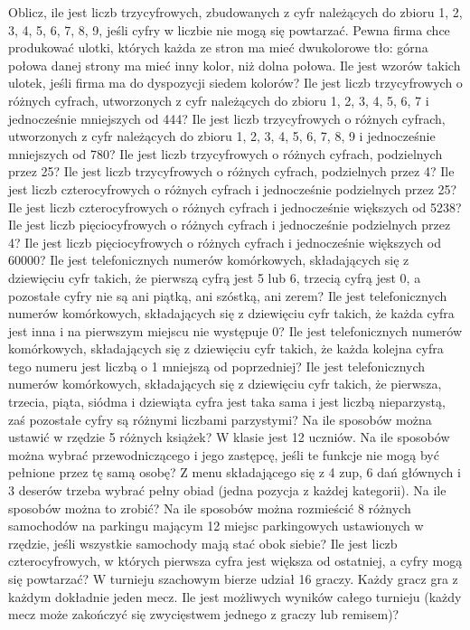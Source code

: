 Oblicz, ile jest liczb trzycyfrowych, zbudowanych z cyfr należących do zbioru {1, 2, 3, 4, 5, 6, 7, 8, 9}, jeśli cyfry w liczbie nie mogą się powtarzać.
Pewna firma chce produkować ulotki, których każda ze stron ma mieć dwukolorowe tło: górna połowa danej strony ma mieć inny kolor, niż dolna połowa. Ile jest wzorów takich ulotek, jeśli firma ma do dyspozycji siedem kolorów?
Ile jest liczb trzycyfrowych o różnych cyfrach, utworzonych z cyfr należących do zbioru {1, 2, 3, 4, 5, 6, 7} i jednocześnie mniejszych od 444?
Ile jest liczb trzycyfrowych o różnych cyfrach, utworzonych z cyfr należących do zbioru {1, 2, 3, 4, 5, 6, 7, 8, 9} i jednocześnie mniejszych od 780?
Ile jest liczb trzycyfrowych o różnych cyfrach, podzielnych przez 25?
Ile jest liczb trzycyfrowych o różnych cyfrach, podzielnych przez 4?
Ile jest liczb czterocyfrowych o różnych cyfrach i jednocześnie podzielnych przez 25?
Ile jest liczb czterocyfrowych o różnych cyfrach i jednocześnie większych od 5238?
Ile jest liczb pięciocyfrowych o różnych cyfrach i jednocześnie podzielnych przez 4?
Ile jest liczb pięciocyfrowych o różnych cyfrach i jednocześnie większych od 60000?
Ile jest telefonicznych numerów komórkowych, składających się z dziewięciu cyfr takich, że pierwszą cyfrą jest 5 lub 6, trzecią cyfrą jest 0, a pozostałe cyfry nie są ani piątką, ani szóstką, ani zerem?
Ile jest telefonicznych numerów komórkowych, składających się z dziewięciu cyfr takich, że każda cyfra jest inna i na pierwszym miejscu nie występuje 0?
Ile jest telefonicznych numerów komórkowych, składających się z dziewięciu cyfr takich, że każda kolejna cyfra tego numeru jest liczbą o 1 mniejszą od poprzedniej?
Ile jest telefonicznych numerów komórkowych, składających się z dziewięciu cyfr takich, że pierwsza, trzecia, piąta, siódma i dziewiąta cyfra jest taka sama i jest liczbą nieparzystą, zaś pozostałe cyfry są różnymi liczbami parzystymi?
Na ile sposobów można ustawić w rzędzie 5 różnych książek?
W klasie jest 12 uczniów. Na ile sposobów można wybrać przewodniczącego i jego zastępcę, jeśli te funkcje nie mogą być pełnione przez tę samą osobę?
Z menu składającego się z 4 zup, 6 dań głównych i 3 deserów trzeba wybrać pełny obiad (jedna pozycja z każdej kategorii). Na ile sposobów można to zrobić?
Na ile sposobów można rozmieścić 8 różnych samochodów na parkingu mającym 12 miejsc parkingowych ustawionych w rzędzie, jeśli wszystkie samochody mają stać obok siebie?
Ile jest liczb czterocyfrowych, w których pierwsza cyfra jest większa od ostatniej, a cyfry mogą się powtarzać?
W turnieju szachowym bierze udział 16 graczy. Każdy gracz gra z każdym dokładnie jeden mecz. Ile jest możliwych wyników całego turnieju (każdy mecz może zakończyć się zwycięstwem jednego z graczy lub remisem)?
